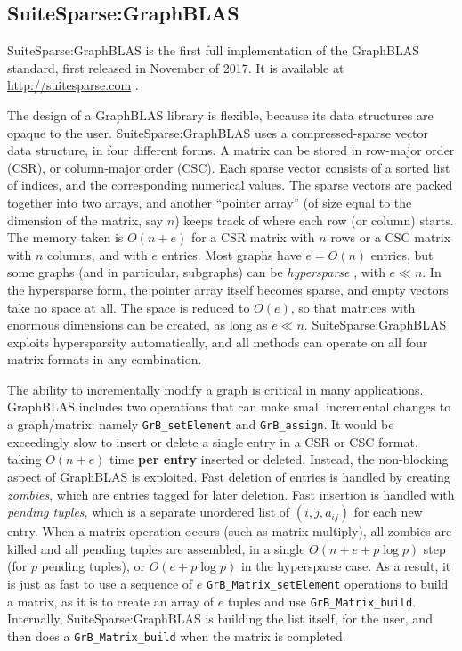 
\subsection{SuiteSparse:GraphBLAS}

SuiteSparse:GraphBLAS is the first full implementation of the GraphBLAS
standard, first released in November of 2017.
It is available at \url{http://suitesparse.com} \cite{Davis19}.

The design of a GraphBLAS library is flexible, because its data structures are
opaque to the user.  SuiteSparse:GraphBLAS uses a compressed-sparse vector
data structure, in four different forms.  A matrix can be stored in
row-major order (CSR), or column-major order (CSC).  Each sparse vector
consists of a sorted list of indices, and the corresponding numerical values.
The sparse vectors are packed together into two arrays, and another ``pointer
array'' (of size equal to the dimension of the matrix, say $n$) keeps track of
where each row (or column) starts.  The memory taken is $O(n+e)$ for a CSR
matrix with $n$ rows or a CSC matrix with $n$ columns, and with $e$ entries.
Most graphs have $e=O(n)$ entries, but some graphs (and in particular,
subgraphs) can be {\em hypersparse} \cite{BulucGilbert08}, with $e \ll n$.  In
the hypersparse form, the pointer array itself becomes sparse, and empty
vectors take no space at all.  The space is reduced to $O(e)$, so that
matrices with enormous dimensions can be created, as long as $e \ll n$.
SuiteSparse:GraphBLAS exploits hypersparsity automatically, and all
methods can operate on all four matrix formats in any combination.

The ability to incrementally modify a graph is critical in many applications.
GraphBLAS includes two operations that can make small incremental changes to a
graph/matrix:  namely \verb'GrB_setElement' and \verb'GrB_assign'.  It would be
exceedingly slow to insert or delete a single entry in a CSR or CSC format,
taking $O(n+e)$ time {\bf per entry} inserted or deleted.  Instead, the
non-blocking aspect of GraphBLAS is exploited.  Fast deletion of entries is
handled by creating {\em zombies}, which are entries tagged for later deletion.
Fast insertion is handled with {\em pending tuples}, which is a separate
unordered list of $(i,j,a_{ij})$ for each new entry.  When a matrix operation
occurs (such as matrix multiply), all zombies are killed and all pending tuples
are assembled, in a single $O(n+ e + p \log p)$ step (for $p$ pending tuples),
or $O(e +p \log p)$ in the hypersparse case.  As a result, it is just as fast
to use a sequence of $e$ \verb'GrB_Matrix_setElement' operations to build a matrix, as
it is to create an array of $e$ tuples and use \verb'GrB_Matrix_build'.  Internally,
SuiteSparse:GraphBLAS is building the list itself, for the user, and then does
a \verb'GrB_Matrix_build' when the matrix is completed.

